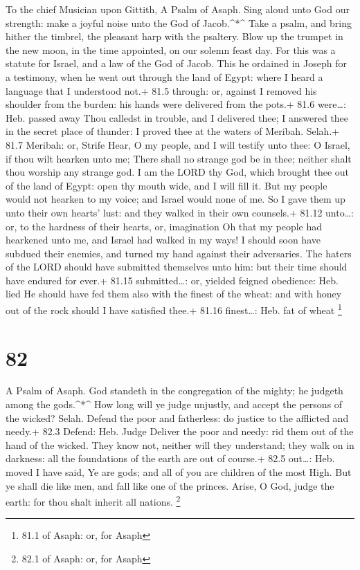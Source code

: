 To the chief Musician upon Gittith, A Psalm of Asaph.  Sing
aloud unto God our strength: make a joyful noise unto the God of
Jacob.\^{}*\^{}  Take a psalm, and bring hither the timbrel,
the pleasant harp with the psaltery.  Blow up the trumpet in
the new moon, in the time appointed, on our solemn feast day.
 For this was a statute for Israel, and a law of the God of
Jacob.  This he ordained in Joseph for a testimony, when he
went out through the land of Egypt: where I heard a language that I
understood not.+ 81.5 through: or, against  I removed his
shoulder from the burden: his hands were delivered from the pots.+ 81.6
were\ldots: Heb. passed away  Thou calledst in trouble, and
I delivered thee; I answered thee in the secret place of thunder: I
proved thee at the waters of Meribah. Selah.+ 81.7 Meribah: or, Strife
 Hear, O my people, and I will testify unto thee: O Israel,
if thou wilt hearken unto me;  There shall no strange god be
in thee; neither shalt thou worship any strange god.  I am
the LORD thy God, which brought thee out of the land of Egypt: open thy
mouth wide, and I will fill it.  But my people would not
hearken to my voice; and Israel would none of me.  So I
gave them up unto their own hearts' lust: and they walked in their own
counsels.+ 81.12 unto\ldots: or, to the hardness of their hearts, or,
imagination  Oh that my people had hearkened unto me, and
Israel had walked in my ways!  I should soon have subdued
their enemies, and turned my hand against their adversaries.
 The haters of the LORD should have submitted themselves
unto him: but their time should have endured for ever.+ 81.15
submitted\ldots: or, yielded feigned obedience: Heb. lied 
He should have fed them also with the finest of the wheat: and with
honey out of the rock should I have satisfied thee.+ 81.16 finest\ldots:
Heb. fat of wheat \footnote{81.1 of Asaph: or, for Asaph}

\hypertarget{section-81}{%
\section{82}\label{section-81}}

A Psalm of Asaph.  God standeth in the congregation of the
mighty; he judgeth among the gods.\^{}*\^{}  How long will
ye judge unjustly, and accept the persons of the wicked? Selah.
 Defend the poor and fatherless: do justice to the afflicted
and needy.+ 82.3 Defend: Heb. Judge  Deliver the poor and
needy: rid them out of the hand of the wicked.  They know
not, neither will they understand; they walk on in darkness: all the
foundations of the earth are out of course.+ 82.5 out\ldots: Heb. moved
 I have said, Ye are gods; and all of you are children of
the most High.  But ye shall die like men, and fall like one
of the princes.  Arise, O God, judge the earth: for thou
shalt inherit all nations. \footnote{82.1 of Asaph: or, for Asaph}

